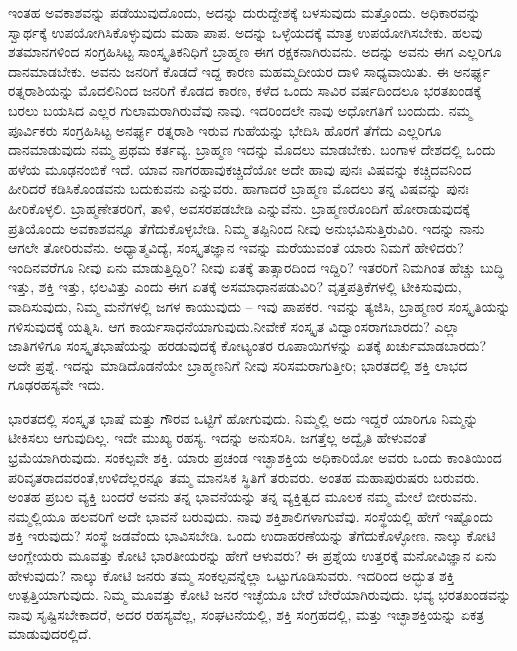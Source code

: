 ಇಂತಹ ಅವಕಾಶವನ್ನು ಪಡೆಯುವುದೊಂದು, ಅದನ್ನು ದುರುದ್ದೇಶಕ್ಕೆ ಬಳಸುವುದು ಮತ್ತೊಂದು. ಅಧಿಕಾರವನ್ನು ಸ್ವಾರ್ಥಕ್ಕೆ ಉಪಯೋಗಿಸಿಕೊಳ್ಳುವುದು ಮಹಾ ಪಾಪ. ಅದನ್ನು ಒಳ್ಳೆಯದಕ್ಕೆ ಮಾತ್ರ ಉಪಯೋಗಿಸಬೇಕು. ಹಲವು ಶತಮಾನಗಳಿಂದ ಸಂಗ್ರಹಿಸಿಟ್ಟ ಸಾಂಸ್ಕೃತಿಕನಿಧಿಗೆ ಬ್ರಾಹ್ಮಣ ಈಗ ರಕ್ಷಕನಾಗಿರುವನು. ಅದನ್ನು ಅವನು ಈಗ ಎಲ್ಲರಿಗೂ ದಾನಮಾಡಬೇಕು. ಅವನು ಜನರಿಗೆ ಕೊಡದೆ ಇದ್ದ ಕಾರಣ ಮಹಮ್ಮದೀಯರ ದಾಳಿ ಸಾಧ್ಯವಾಯಿತು. ಈ ಅನರ್ಘ್ಯ ರತ್ನರಾಶಿಯನ್ನು ಮೊದಲಿನಿಂದ ಜನರಿಗೆ ಕೊಡದ ಕಾರಣ, ಕಳೆದ ಒಂದು ಸಾವಿರ ವರ್ಷದಿಂದಲೂ ಭರತಖಂಡಕ್ಕೆ ಬರಲು ಬಯಸಿದ ಎಲ್ಲರ ಗುಲಾಮರಾಗಿರುವೆವು ನಾವು. ಇದರಿಂದಲೇ ನಾವು ಅಧೋಗತಿಗೆ ಬಂದುದು. ನಮ್ಮ ಪೂರ್ವಿಕರು ಸಂಗ್ರಹಿಸಿಟ್ಟ ಅನರ್ಘ್ಯ ರತ್ನರಾಶಿ ಇರುವ ಗುಹೆಯನ್ನು ಭೇದಿಸಿ ಹೊರಗೆ ತೆಗೆದು ಎಲ್ಲರಿಗೂ ದಾನಮಾಡುವುದು ನಮ್ಮ ಪ್ರಥಮ ಕರ್ತವ್ಯ. ಬ್ರಾಹ್ಮಣ ಇದನ್ನು ಮೊದಲು ಮಾಡಬೇಕು. ಬಂಗಾಳ ದೇಶದಲ್ಲಿ ಒಂದು ಹಳೆಯ ಮೂಢನಂಬಿಕೆ ಇದೆ. ಯಾವ ನಾಗರಹಾವು\break ಕಚ್ಚಿದೆಯೋ ಅದೇ ಹಾವು ಪುನಃ ವಿಷವನ್ನು ಕಚ್ಚಿದವನಿಂದ ಹೀರಿದರೆ ಕಡಿಸಿಕೊಂಡವನು ಬದುಕುವನು ಎನ್ನುವರು. ಹಾಗಾದರೆ ಬ್ರಾಹ್ಮಣ ಮೊದಲು ತನ್ನ ವಿಷವನ್ನು ಪುನಃ ಹೀರಿಕೊಳ್ಳಲಿ. ಬ್ರಾಹ್ಮಣೇತರರಿಗೆ, ತಾಳಿ, ಅವಸರಪಡಬೇಡಿ ಎನ್ನುವೆನು. ಬ್ರಾಹ್ಮಣರೊಂದಿಗೆ ಹೋರಾಡುವುದಕ್ಕೆ ಪ್ರತಿಯೊಂದು ಅವಕಾಶವನ್ನೂ ತೆಗೆದುಕೊಳ್ಳಬೇಡಿ. ನಿಮ್ಮ ತಪ್ಪಿನಿಂದ ನೀವು ಅನುಭವಿಸುತ್ತಿರುವಿರಿ. ಇದನ್ನು ನಾನು ಆಗಲೇ ತೋರಿರುವೆನು. ಅಧ್ಯಾತ್ಮವಿದ್ಯೆ, ಸಂಸ್ಕೃತಜ್ಞಾನ ಇವನ್ನು ಮರೆಯುವಂತೆ ಯಾರು ನಿಮಗೆ ಹೇಳಿದರು? ಇಂದಿನವರೆಗೂ ನೀವು ಏನು ಮಾಡುತ್ತಿದ್ದಿರಿ? ನೀವು ಏತಕ್ಕೆ ತಾತ್ಸಾರದಿಂದ ಇದ್ದಿರಿ? ಇತರರಿಗೆ ನಿಮಗಿಂತ ಹೆಚ್ಚು ಬುದ್ಧಿ ಇತ್ತು, ಶಕ್ತಿ ಇತ್ತು, ಛಲವಿತ್ತು ಎಂದು ಈಗ ಏತಕ್ಕೆ ಅಸಮಾಧಾನಪಡುವಿರಿ? ವೃತ್ತಪತ್ರಿಕೆಗಳಲ್ಲಿ ಟೀಕಿಸುವುದು, ವಾದಿಸುವುದು, ನಿಮ್ಮ ಮನೆಗಳಲ್ಲಿ ಜಗಳ ಕಾಯುವುದು – ಇವು ಪಾಪಕರ. ಇವನ್ನು ತ್ಯಜಿಸಿ, ಬ್ರಾಹ್ಮಣರ ಸಂಸ್ಕೃತಿಯನ್ನು ಗಳಿಸುವುದಕ್ಕೆ ಯತ್ನಿಸಿ. ಆಗ ಕಾರ್ಯಸಾಧನೆಯಾಗುವುದು.\break ನೀವೇಕೆ ಸಂಸ್ಕೃತ ವಿದ್ವಾಂಸರಾಗಬಾರದು? ಎಲ್ಲಾ ಜಾತಿಗಳಿಗೂ ಸಂಸ್ಕೃತ\break ಭಾಷೆಯನ್ನು ಹರಡುವುದಕ್ಕೆ ಕೋಟ್ಯಂತರ ರೂಪಾಯಿಗಳನ್ನು ಏತಕ್ಕೆ ಖರ್ಚು\break ಮಾಡಬಾರದು? ಅದೇ ಪ್ರಶ್ನೆ. ಇದನ್ನು ಮಾಡಿದೊಡನೆಯೇ ಬ್ರಾಹ್ಮಣನಿಗೆ ನೀವು ಸರಿಸಮರಾಗುತ್ತೀರಿ; ಭಾರತದಲ್ಲಿ ಶಕ್ತಿ ಲಾಭದ ಗೂಢರಹಸ್ಯವೇ ಇದು.

\vskip -1pt

ಭಾರತದಲ್ಲಿ ಸಂಸ್ಕೃತ ಭಾಷೆ ಮತ್ತು ಗೌರವ ಒಟ್ಟಿಗೆ ಹೋಗುವುದು. ನಿಮ್ಮಲ್ಲಿ ಅದು ಇದ್ದರೆ ಯಾರಿಗೂ ನಿಮ್ಮನ್ನು ಟೀಕಿಸಲು ಆಗುವುದಿಲ್ಲ. ಇದೇ ಮುಖ್ಯ ರಹಸ್ಯ. ಇದನ್ನು ಅನುಸರಿಸಿ. ಜಗತ್ತೆಲ್ಲ ಅದ್ವೈತಿ ಹೇಳುವಂತೆ ಭ್ರಮೆಯಾಗಿರುವುದು. ಸಂಕಲ್ಪವೇ ಶಕ್ತಿ. ಯಾರು ಪ್ರಚಂಡ ಇಚ್ಛಾಶಕ್ತಿಯ ಅಧಿಕಾರಿಯೋ ಅವರು ಒಂದು ಕಾಂತಿಯಿಂದ ಪರಿವೃತರಾದವರಂತೆ,\break ಉಳಿದೆಲ್ಲರನ್ನೂ ತಮ್ಮ ಮಾನಸಿಕ ಸ್ಥಿತಿಗೆ ತರುವರು. ಅಂತಹ ಮಹಾಪುರುಷರು ಬರುವರು. ಅಂತಹ ಪ್ರಬಲ ವ್ಯಕ್ತಿ ಬಂದರೆ ಅವನು ತನ್ನ ಭಾವನೆಯನ್ನು ತನ್ನ ವ್ಯಕ್ತಿತ್ವದ ಮೂಲಕ ನಮ್ಮ ಮೇಲೆ ಬೀರುವನು. ನಮ್ಮಲ್ಲಿಯೂ ಹಲವರಿಗೆ ಅದೇ ಭಾವನೆ ಬರುವುದು. ನಾವು ಶಕ್ತಿಶಾಲಿಗಳಾಗುವೆವು. ಸಂಸ್ಥೆಯಲ್ಲಿ ಹೇಗೆ ಇಷ್ಟೊಂದು ಶಕ್ತಿ ಇರುವುದು? ಸಂಸ್ಥೆ ಜಡವೆಂದು ಭಾವಿಸಬೇಡಿ. ಒಂದು ಉದಾಹರಣೆಯನ್ನು ತೆಗೆದುಕೊಳ್ಳೋಣ. ನಾಲ್ಕು ಕೋಟಿ ಆಂಗ್ಲೇಯರು ಮೂವತ್ತು ಕೋಟಿ ಭಾರತೀಯರನ್ನು ಹೇಗೆ ಆಳುವರು? ಈ ಪ್ರಶ್ನೆಯ ಉತ್ತರಕ್ಕೆ ಮನೋವಿಜ್ಞಾನ ಏನು ಹೇಳುವುದು? ನಾಲ್ಕು ಕೋಟಿ ಜನರು ತಮ್ಮ ಸಂಕಲ್ಪವನ್ನೆಲ್ಲಾ ಒಟ್ಟುಗೂಡಿಸುವರು. ಇದರಿಂದ ಅದ್ಭುತ ಶಕ್ತಿ ಉತ್ಪತ್ತಿಯಾಗುವುದು. ನಿಮ್ಮ ಮೂವತ್ತು ಕೋಟಿ ಜನರ ಇಚ್ಛೆಯೂ ಬೇರೆ ಬೇರೆಯಾಗಿರುವುದು. ಭವ್ಯ ಭರತಖಂಡವನ್ನು ನಾವು ಸೃಷ್ಟಿಸಬೇಕಾದರೆ, ಅದರ ರಹಸ್ಯವೆಲ್ಲ, ಸಂಘಟನೆಯಲ್ಲಿ, ಶಕ್ತಿ ಸಂಗ್ರಹದಲ್ಲಿ, ಮತ್ತು ಇಚ್ಛಾಶಕ್ತಿಯನ್ನು ಏಕತ್ರ ಮಾಡುವುದರಲ್ಲಿದೆ.


